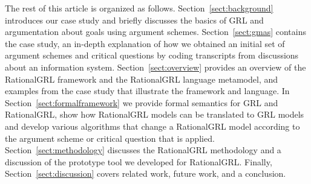 The rest of this article is organized as follows. Section~\ref{sect:background} introduces our case study and briefly discusses the basics of GRL and argumentation about goals using argument schemes. Section~\ref{sect:gmas} contains the case study, an in-depth explanation of how we obtained an initial set of argument schemes and critical questions by coding transcripts from discussions about an information system. Section~\ref{sect:overview} provides an overview of the RationalGRL framework and the RationalGRL language metamodel, and examples from the case study that illustrate the framework and language. In Section~\ref{sect:formalframework} we provide formal semantics for GRL and RationalGRL, show how RationalGRL models can be translated to GRL models and develop various algorithms that change a RationalGRL model according to the argument scheme or critical question that is applied. Section~\ref{sect:methodology} discusses the RationalGRL methodology and a discussion of the prototype tool we developed for RationalGRL. Finally, Section~\ref{sect:discussion} covers related work, future work, and a conclusion.